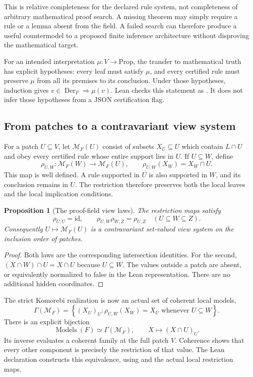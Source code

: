 \documentclass[11pt,oneside]{article}
\theoremstyle{komorebiplain}
\newtheorem{proposition}[theorem]{Proposition}
\theoremstyle{komorebidefinition}
\theoremstyle{komorebiremark}
\begin{document}
This is relative completeness for the declared rule system, not completeness of arbitrary mathematical proof search. A missing theorem may simply require a rule or a lemma absent from the field. A failed search can therefore produce a useful countermodel to a proposed finite inference architecture without disproving the mathematical target.

For an intended interpretation $\mu:V\to\mathrm{Prop}$, the transfer to mathematical truth has explicit hypotheses: every leaf must satisfy $\mu$, and every certified rule must preserve $\mu$ from all its premises to its conclusion. Under those hypotheses, induction gives $v\in\operatorname{Der}_F\Rightarrow\mu(v)$. Lean checks this statement as . It does not infer those hypotheses from a JSON certification flag.

\subsection{From patches to a contravariant view system}

For a patch $U\subseteq V$, let $\mathcal M_F(U)$ consist of subsets $X_U\subseteq U$ which contain $L\cap U$ and obey every certified rule whose entire support lies in $U$. If $U\subseteq W$, define
\[
\rho_{U,W}:\mathcal M_F(W)\longrightarrow\mathcal M_F(U),
\qquad \rho_{U,W}(X_W)=X_W\cap U.
\]
This map is well defined. A rule supported in $U$ is also supported in $W$, and its conclusion remains in $U$. The restriction therefore preserves both the local leaves and the local implication conditions.

\begin{proposition}[The proof-field view laws]
\label{res:24:2}
The restriction maps satisfy
\[
\rho_{U,U}=\mathrm{id},\qquad
\rho_{U,W}\rho_{W,Z}=\rho_{U,Z}\quad(U\subseteq W\subseteq Z).
\]
Consequently $U\mapsto\mathcal M_F(U)$ is a contravariant set-valued view system on the inclusion order of patches.
\end{proposition}
\begin{proof}
Both laws are the corresponding intersection identities. For the second, $(X\cap W)\cap U=X\cap U$ because $U\subseteq W$. The values outside a patch are absent, or equivalently normalized to false in the Lean representation. There are no additional hidden coordinates.
\end{proof}

The strict Komorebi realization is now an actual set of coherent local models,
\[
\Gamma(\mathcal M_F)=
\left\{(X_U)_U:\rho_{U,W}(X_W)=X_U\text{ whenever }U\subseteq W\right\}.
\]
There is an explicit bijection
\[
\operatorname{Models}(F)\simeq\Gamma(\mathcal M_F),
\qquad X\longmapsto(X\cap U)_U.
\]
Its inverse evaluates a coherent family at the full patch $V$. Coherence shows that every other component is precisely the restriction of that value. The Lean declaration  constructs this equivalence, using  and the actual local restriction maps.
\end{document}
